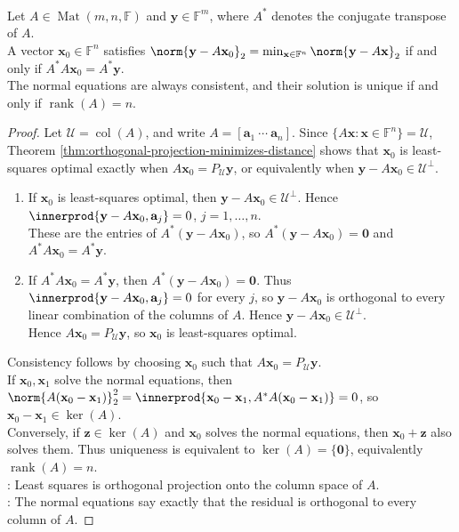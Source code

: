 \begin{theorem} \label{thm:matrix-least-squares-normal-equations} \\
Let $A\in\operatorname{Mat}(m,n,\mathbb{F})$ and $\mathbf{y}\in\mathbb{F}^m$, where $A^*$ denotes the conjugate transpose of $A$.\\
A vector $\mathbf{x}_0\in\mathbb{F}^n$ satisfies $\norm{\mathbf{y}-A\mathbf{x}_0}_2=\min_{\mathbf{x}\in\mathbb{F}^n}\norm{\mathbf{y}-A\mathbf{x}}_2$ if and only if $A^*A\mathbf{x}_0=A^*\mathbf{y}$.\\
The normal equations are always consistent, and their solution is unique if and only if $\operatorname{rank}(A)=n$.
\begin{proof}
Let $\mathcal{U}=\operatorname{col}(A)$, and write $A=[\mathbf{a}_1\ \cdots\ \mathbf{a}_n]$. Since $\{A\mathbf{x}:\mathbf{x}\in\mathbb{F}^n\}=\mathcal{U}$, Theorem \ref{thm:orthogonal-projection-minimizes-distance} shows that $\mathbf{x}_0$ is least-squares optimal exactly when $A\mathbf{x}_0=P_{\mathcal{U}}\mathbf{y}$, or equivalently when $\mathbf{y}-A\mathbf{x}_0\in\mathcal{U}^{\perp}$.
\begin{enumerate}[label=\roman*.]
\setlength{\itemsep}{0pt}
\item[$(\Rightarrow)$] If $\mathbf{x}_0$ is least-squares optimal, then $\mathbf{y}-A\mathbf{x}_0\in\mathcal{U}^{\perp}$. Hence $\innerprod{\mathbf{y}-A\mathbf{x}_0,\mathbf{a}_j}=0$, $j=1,\ldots,n$.\\
These are the entries of $A^*(\mathbf{y}-A\mathbf{x}_0)$, so $A^*(\mathbf{y}-A\mathbf{x}_0)=\mathbf{0}$ and $A^*A\mathbf{x}_0=A^*\mathbf{y}$.
\item[$(\Leftarrow)$] If $A^*A\mathbf{x}_0=A^*\mathbf{y}$, then $A^*(\mathbf{y}-A\mathbf{x}_0)=\mathbf{0}$. Thus $\innerprod{\mathbf{y}-A\mathbf{x}_0,\mathbf{a}_j}=0$ for every $j$, so $\mathbf{y}-A\mathbf{x}_0$ is orthogonal to every linear combination of the columns of $A$. Hence $\mathbf{y}-A\mathbf{x}_0\in\mathcal{U}^{\perp}$.\\
Hence $A\mathbf{x}_0=P_{\mathcal{U}}\mathbf{y}$, so $\mathbf{x}_0$ is least-squares optimal.
\end{enumerate}
Consistency follows by choosing $\mathbf{x}_0$ such that $A\mathbf{x}_0=P_{\mathcal{U}}\mathbf{y}$.\\
If $\mathbf{x}_0,\mathbf{x}_1$ solve the normal equations, then $\norm{A(\mathbf{x}_0-\mathbf{x}_1)}_2^2 =\innerprod{\mathbf{x}_0-\mathbf{x}_1,A^*A(\mathbf{x}_0-\mathbf{x}_1)}=0$, so $\mathbf{x}_0-\mathbf{x}_1\in\ker(A)$.\\
Conversely, if $\mathbf{z}\in\ker(A)$ and $\mathbf{x}_0$ solves the normal equations, then $\mathbf{x}_0+\mathbf{z}$ also solves them. Thus uniqueness is equivalent to $\ker(A)=\{\mathbf{0}\}$, equivalently $\operatorname{rank}(A)=n$.\\
: Least squares is orthogonal projection onto the column space of $A$.\\
: The normal equations say exactly that the residual is orthogonal to every column of $A$.
\end{proof}
\end{theorem}

